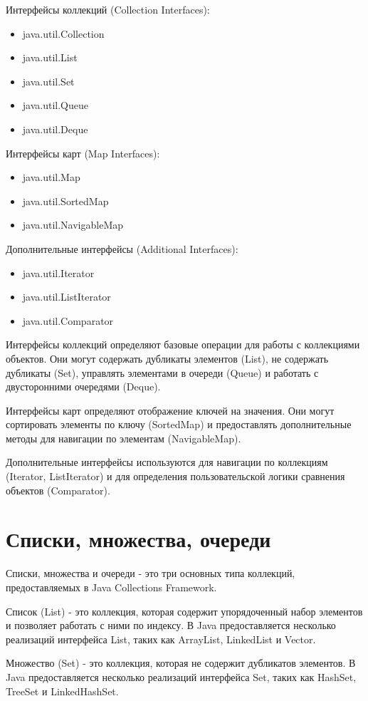     Интерфейсы коллекций (Collection Interfaces):
    \begin{itemize}
    \item java.util.Collection
    \item java.util.List
    \item java.util.Set
    \item java.util.Queue
    \item java.util.Deque
\end{itemize}
    Интерфейсы карт (Map Interfaces):
\begin{itemize}
    \item java.util.Map
    \item java.util.SortedMap
    \item java.util.NavigableMap
\end{itemize}
    Дополнительные интерфейсы (Additional Interfaces):
\begin{itemize}
    \item java.util.Iterator
    \item java.util.ListIterator
    \item java.util.Comparator
\end{itemize}
Интерфейсы коллекций определяют базовые операции для работы с коллекциями объектов. Они могут содержать дубликаты элементов (List), не содержать дубликаты (Set), управлять элементами в очереди (Queue) и работать с двусторонними очередями (Deque).

Интерфейсы карт определяют отображение ключей на значения. Они могут сортировать элементы по ключу (SortedMap) и предоставлять дополнительные методы для навигации по элементам (NavigableMap).

Дополнительные интерфейсы используются для навигации по коллекциям (Iterator, ListIterator) и для определения пользовательской логики сравнения объектов (Comparator).

\section{Списки, множества, очереди}
Списки, множества и очереди - это три основных типа коллекций, предоставляемых в Java Collections Framework.

Список (List) - это коллекция, которая содержит упорядоченный набор элементов и позволяет работать с ними по индексу. В Java предоставляется несколько реализаций интерфейса List, таких как ArrayList, LinkedList и Vector.

Множество (Set) - это коллекция, которая не содержит дубликатов элементов. В Java предоставляется несколько реализаций интерфейса Set, таких как HashSet, TreeSet и \newline LinkedHashSet.

